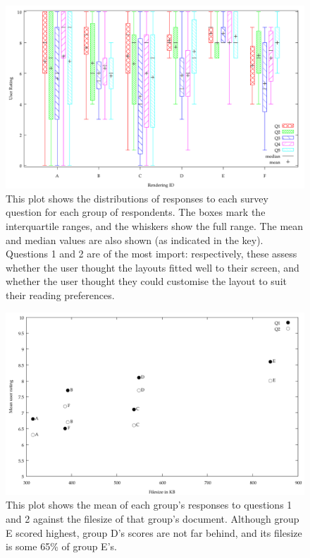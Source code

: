 \begin{figure}
  \begin{center}
  \includegraphics[height=0.5\textheight]{gnuplot/survey.pdf}
  \end{center}
  \caption[Plot showing user study results]{This plot shows the distributions of responses to each survey question for each group of respondents. The boxes mark the interquartile ranges, and the whiskers show the full range. The mean and median values are also shown (as indicated in the key). Questions 1 and 2 are of the most import: respectively, these assess whether the user thought the layouts fitted well to their screen, and whether the user thought they could customise the layout to suit their reading preferences.}
  \label{fig:surveygraph}
\end{figure}

\begin{figure}
  \begin{center}
  \includegraphics[height=0.5\textheight]{gnuplot/fsizes.pdf}
  \end{center}
  \caption[Plot of user rating against filesize]{This plot shows the mean of each group's responses to questions 1 and 2 against the filesize of that group's document. Although group E scored highest, group D's scores are not far behind, and its filesize is some 65\% of group E's.}
  \label{fig:fsgraph}
\end{figure}

